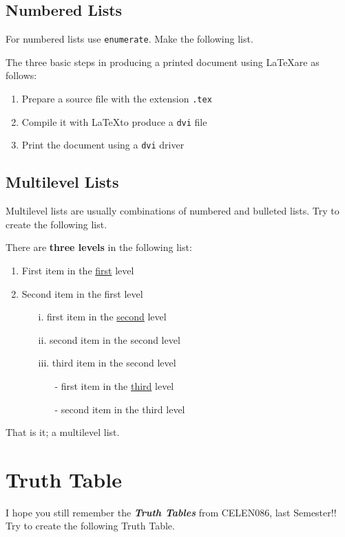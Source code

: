 \documentclass[a4paper,11pt]{article}
\begin{document}
\subsection{Numbered Lists}

For numbered lists use \texttt{enumerate}. Make the following list.

The three basic steps in producing a printed document using \LaTeX are as follows:
\begin{enumerate}
\item Prepare a source file with the extension \texttt{.tex}
\item Compile it with \LaTeX to produce a \texttt{dvi} file
\item Print the document using a \texttt{dvi} driver
\end{enumerate}

\subsection{Multilevel Lists}

Multilevel lists are usually combinations of numbered and bulleted lists. Try to create the following list.

There are \textbf{three levels} in the following list:
\begin{enumerate}
\item First item in the \underline{first} level
\item Second item in the first level
\begin{enumerate}
\item[i.] first item in the \underline{second} level
\item[ii.] second item in the second level
\item[iii.] third item in the second level
\begin{itemize}
\item[-] first item in the \underline{third} level
\item[-] second item in the third level
\end{itemize}
\end{enumerate}
\end{enumerate}
That is it; a multilevel list.

\newpage
\section{Truth Table}

I hope you still remember the \textbf{\textit{Truth Tables}} from CELEN086, last Semester!! Try to create the following Truth Table.
\end{document}
